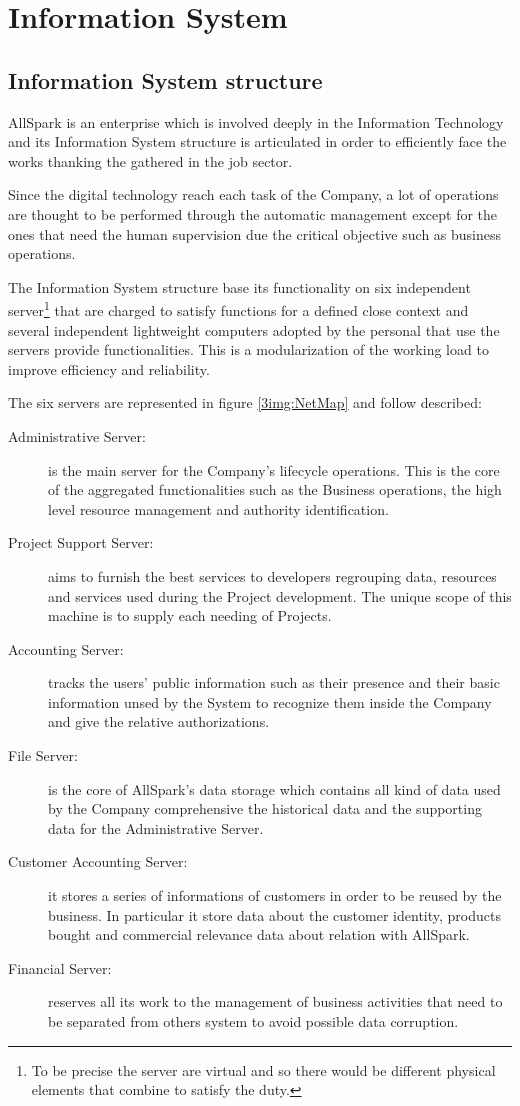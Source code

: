 \chapter{Information System}
 
\section{Information System structure}
AllSpark is an enterprise which is involved deeply in the Information Technology and its Information System structure is articulated in order to efficiently face the works thanking the gathered in the job sector.

Since the digital technology reach each task of the Company, a lot of operations are thought to be performed through the automatic management except for the ones that need the human supervision due the critical objective such as business operations. 

The Information System structure base its functionality on six independent server\footnote{To be precise the server are virtual and so there would be different physical elements that combine to satisfy the duty.} that are charged to satisfy functions for a defined close context and several independent lightweight computers adopted by the personal that use the servers provide functionalities. This is a modularization of the working load to improve efficiency and reliability.

The six servers are represented in figure \ref{3img:NetMap} and follow described:
\begin{description}
\item[Administrative Server:] is the main server for the Company's lifecycle operations. This is the core of the aggregated functionalities such as the Business operations, the high level resource management and authority identification.
\item[Project Support Server:] aims to furnish the best services to developers regrouping data, resources and services used during the Project development. The unique scope of this machine is to supply each needing of Projects.
\item[Accounting Server:] tracks the users' public information such as their presence and their basic information unsed by the System to recognize them inside the Company and give the relative authorizations.
\item[File Server:] is the core of AllSpark's data storage which contains all kind of data used by the Company comprehensive the historical data and the supporting data for the Administrative Server. 
\item[Customer Accounting Server:] it stores a series of informations of customers in order to be reused by the business. In particular it store data about the customer identity, products bought and commercial relevance data about relation with AllSpark.
\item[Financial Server:] reserves all its work to the management of business activities that need to be separated from others system to avoid possible data corruption.
\end{description}

